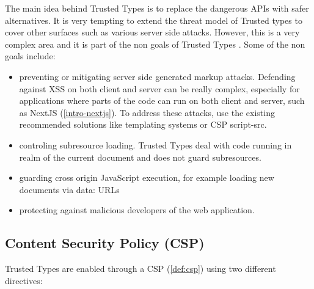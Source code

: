 The main idea behind Trusted Types is to replace the dangerous APIs with safer alternatives. It is
very tempting to extend the threat model of Trusted types to cover other surfaces such as various
server side attacks. However, this is a very complex area and it is part of the non goals of Trusted
Types \cite{tt_spec:non_goals}. Some of the non goals include:

\begin{itemize}
  \item preventing or mitigating server side generated markup attacks. Defending against XSS on both
        client and server can be really complex, especially for applications where parts of the code
        can run on both client and server, such as NextJS (\ref{intro-nextjs}). To address these
        attacks, use the existing recommended solutions like templating systems or CSP script-src.
  \item controling subresource loading. Trusted Types deal with code running in realm of the current
        document and does not guard subresources.
  \item guarding cross origin JavaScript execution, for example loading new documents via data: URLs
  \item protecting against malicious developers of the web application.
\end{itemize}

\subsection{Content Security Policy (CSP)}
\label{csp}

Trusted Types are enabled through a CSP (\ref{def:csp}) using two different directives:

